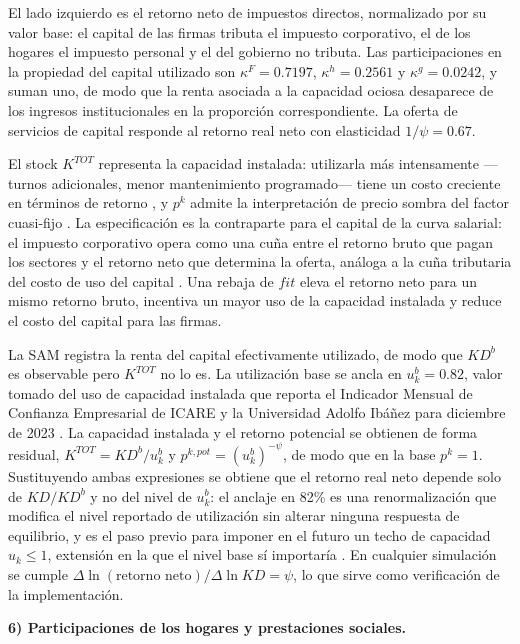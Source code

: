 \documentclass[11pt]{article}
\begin{document}
El lado izquierdo es el retorno neto de impuestos directos, normalizado por su valor base: el capital de las firmas tributa el impuesto corporativo, el de los hogares el impuesto personal y el del gobierno no tributa. Las participaciones en la propiedad del capital utilizado son $\kappa^{F}=0.7197$, $\kappa^{h}=0.2561$ y $\kappa^{g}=0.0242$, y suman uno, de modo que la renta asociada a la capacidad ociosa desaparece de los ingresos institucionales en la proporción correspondiente. La oferta de servicios de capital responde al retorno real neto con elasticidad $1/\psi=0.67$.

El stock $K^{TOT}$ representa la capacidad instalada: utilizarla más intensamente ---turnos adicionales, menor mantenimiento programado--- tiene un costo creciente en términos de retorno \cite{greenwood_hercowitz_huffman_1988}, y $p^{k}$ admite la interpretación de precio sombra del factor cuasi-fijo \cite{berndt_fuss_1986}. La especificación es la contraparte para el capital de la curva salarial: el impuesto corporativo opera como una cuña entre el retorno bruto que pagan los sectores y el retorno neto que determina la oferta, análoga a la cuña tributaria del costo de uso del capital \cite{hall_jorgenson_1967}. Una rebaja de $fit$ eleva el retorno neto para un mismo retorno bruto, incentiva un mayor uso de la capacidad instalada y reduce el costo del capital para las firmas.

La SAM registra la renta del capital efectivamente utilizado, de modo que $KD^{b}$ es observable pero $K^{TOT}$ no lo es. La utilización base se ancla en $u_{k}^{b}=0.82$, valor tomado del uso de capacidad instalada que reporta el Indicador Mensual de Confianza Empresarial de ICARE y la Universidad Adolfo Ibáñez para diciembre de 2023 \cite{imce_2023}. La capacidad instalada y el retorno potencial se obtienen de forma residual, $K^{TOT}=KD^{b}/u_{k}^{b}$ y $p^{k,pot}=\left(u_{k}^{b}\right)^{-\psi}$, de modo que en la base $p^{k}=1$. Sustituyendo ambas expresiones se obtiene que el retorno real neto depende solo de $KD/KD^{b}$ y no del nivel de $u_{k}^{b}$: el anclaje en 82\% es una renormalización que modifica el nivel reportado de utilización sin alterar ninguna respuesta de equilibrio, y es el paso previo para imponer en el futuro un techo de capacidad $u_{k}\leq 1$, extensión en la que el nivel base sí importaría \cite{corrado_mattey_1997}. En cualquier simulación se cumple $\Delta\ln(\text{retorno neto})/\Delta\ln KD=\psi$, lo que sirve como verificación de la implementación.

\textbf{6) Participaciones de los hogares y prestaciones sociales.}
\end{document}

